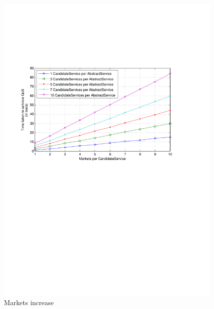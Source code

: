 \documentclass[10pt,journal,compsoc]{IEEEtran}
\begin{document}
\begin{figure}[htbp]
  \centering
  \includegraphics[clip, trim=0cm 13cm 3cm 6cm, scale=0.40]{graphs/1_3_5_7_10_svc_per_mkt_scaling.pdf}
  \caption{Markets increase\label{fig:svc_per_mkt}}		
\end{figure}
\end{document}
